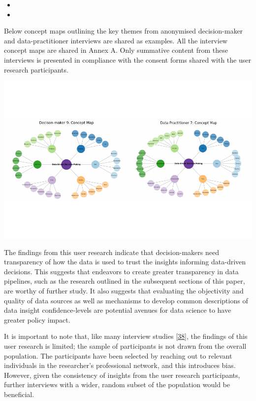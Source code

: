 \documentclass{article}
\providecommand{\tightlist}{%
  \setlength{\itemsep}{0pt}\setlength{\parskip}{0pt}}
\begin{document}
\begin{itemize}
\tightlist
\item
\item
\end{itemize}

Below concept maps outlining the key themes from anonymised
decision-maker and data-practitioner interviews are shared as examples.
All the interview concept maps are shared in Annex A. Only summative
content from these interviews is presented in compliance with the
consent forms shared with the user research participants.

\vspace{-1.5cm}

\includegraphics{210431461_CSC8639_Dissertation_files/figure-latex/ConceptMapExample-1.pdf}
\vspace{-1.5cm}

The findings from this user research indicate that decision-makers need
transparency of how the data is used to trust the insights informing
data-driven decisions. This suggests that endeavors to create greater
transparency in data pipelines, such as the research outlined in the
subsequent sections of this paper, are worthy of further study. It also
suggests that evaluating the objectivity and quality of data sources as
well as mechanisms to develop common descriptions of data insight
confidence-levels are potential avenues for data science to have greater
policy impact.

It is important to note that, like many interview studies
\protect\hyperlink{ref-futzing}{{[}38{]}}, the findings of this user
research is limited; the sample of participants is not drawn from the
overall population. The participants have been selected by reaching out
to relevant individuals in the researcher's professional network, and
this introduces bias. However, given the consistency of insights from
the user research participants, further interviews with a wider, random
subset of the population would be beneficial.
\end{document}

